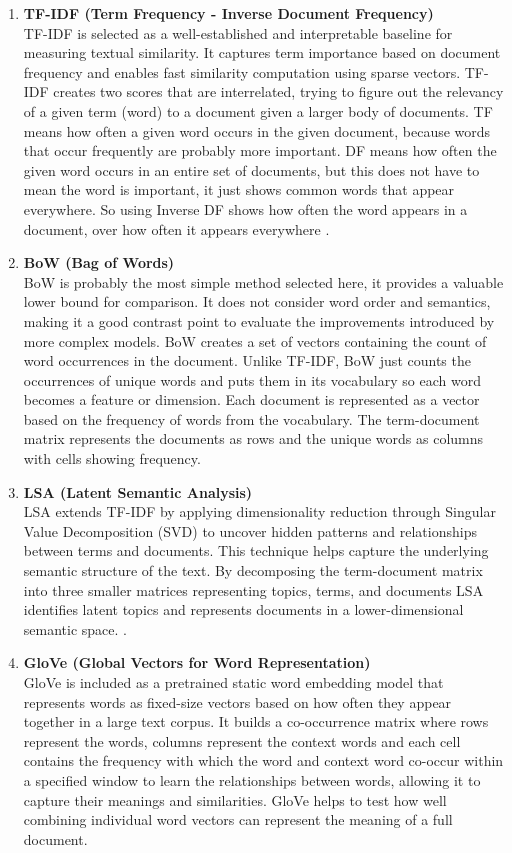 \documentclass[\myFontSize,a4paper,oneside,hidelinks]{article}
\begin{document}
\begin{enumerate}
\item \textbf{TF-IDF (Term Frequency - Inverse Document Frequency)}\\
TF-IDF is selected as a well-established and interpretable baseline for measuring textual similarity. It captures term importance based on document frequency and enables fast similarity computation using sparse vectors.
TF-IDF creates two scores that are interrelated, trying to figure out the relevancy of a given term (word) to a document given a larger body of documents. TF means how often a given word occurs in the given document, because words that occur frequently are probably more important. DF means how often the given word occurs in an entire set of documents, but this does not have to mean the word is important, it just shows common words that appear everywhere. So using Inverse DF shows how often the word appears in a document, over how often it appears everywhere \cite{pub.1022525812}.


\item \textbf{BoW (Bag of Words)}\\
BoW is probably the most simple method selected here, it provides a valuable lower bound for comparison. It does not consider word order and semantics, making it a good contrast point to evaluate the improvements introduced by more complex models.
BoW creates a set of vectors containing the count of word occurrences in the document. Unlike TF-IDF, BoW just counts the occurrences of unique words and puts them in its vocabulary so each word becomes a feature or dimension. Each document is represented as a vector based on the frequency of words from the vocabulary. The term-document matrix represents the documents as rows and the unique words as columns with cells showing frequency.
 

\item \textbf{LSA (Latent Semantic Analysis)}\\
LSA extends TF-IDF by applying dimensionality reduction through Singular Value Decomposition (SVD) to uncover hidden patterns and relationships between terms and documents. This technique helps capture the underlying semantic structure of the text. By decomposing the term-document matrix into three smaller matrices representing topics, terms, and documents LSA identifies latent topics and represents documents in a lower-dimensional semantic space. \cite{Bergamaschi2015247}.


\item \textbf{GloVe (Global Vectors for Word Representation)}\\
GloVe is included as a pretrained static word embedding model that represents words as fixed-size vectors based on how often they appear together in a large text corpus. It builds a co-occurrence matrix where rows represent the words, columns represent the context words and each cell contains the frequency with which the word and context word co-occur within a specified window to learn the relationships between words, allowing it to capture their meanings and similarities. GloVe helps to test how well combining individual word vectors can represent the meaning of a full document.



\end{enumerate}
\end{document}
